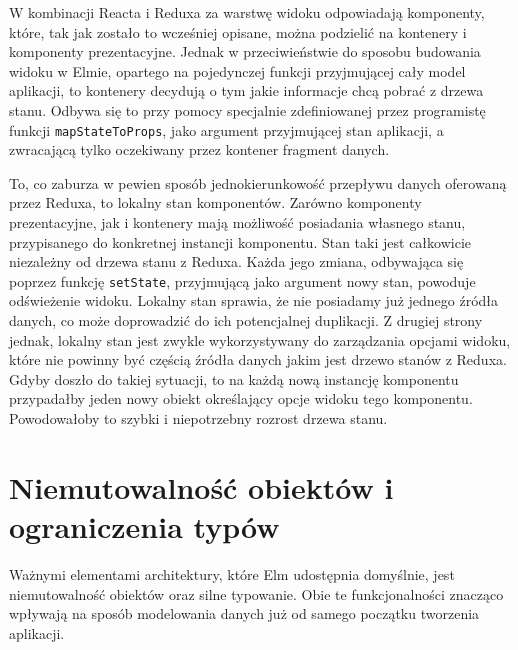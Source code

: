 W kombinacji Reacta i Reduxa za warstwę widoku odpowiadają komponenty, które, tak jak zostało to wcześniej opisane, można podzielić na kontenery i komponenty prezentacyjne. Jednak w przeciwieństwie do sposobu budowania widoku w Elmie, opartego na pojedynczej funkcji przyjmującej cały model aplikacji, to kontenery decydują o tym jakie informacje chcą pobrać z drzewa stanu. Odbywa się to przy pomocy specjalnie zdefiniowanej przez programistę funkcji \lstinline{mapStateToProps}, jako argument przyjmującej stan aplikacji, a zwracającą tylko oczekiwany przez kontener fragment danych. 

To, co zaburza w pewien sposób jednokierunkowość przepływu danych oferowaną przez Reduxa, to lokalny stan komponentów. Zarówno komponenty prezentacyjne, jak i kontenery mają możliwość posiadania własnego stanu, przypisanego do konkretnej instancji komponentu. Stan taki jest całkowicie niezależny od drzewa stanu z Reduxa. Każda jego zmiana, odbywająca się poprzez funkcję \lstinline{setState}, przyjmującą jako argument nowy stan, powoduje odświeżenie widoku. Lokalny stan sprawia, że nie posiadamy już jednego źródła danych, co może doprowadzić do ich potencjalnej duplikacji. Z drugiej strony jednak, lokalny stan jest zwykle wykorzystywany do zarządzania opcjami widoku, które nie powinny być częścią źródła danych jakim jest drzewo stanów z Reduxa. Gdyby doszło do takiej sytuacji, to na każdą nową instancję komponentu przypadałby jeden nowy obiekt określający opcje widoku tego komponentu. Powodowałoby to szybki i niepotrzebny rozrost drzewa stanu.

\section{Niemutowalność obiektów i ograniczenia typów}
Ważnymi elementami architektury, które Elm udostępnia domyślnie, jest niemutowalność obiektów oraz silne typowanie. Obie te funkcjonalności znacząco wpływają na sposób modelowania danych już od samego początku tworzenia aplikacji. 

